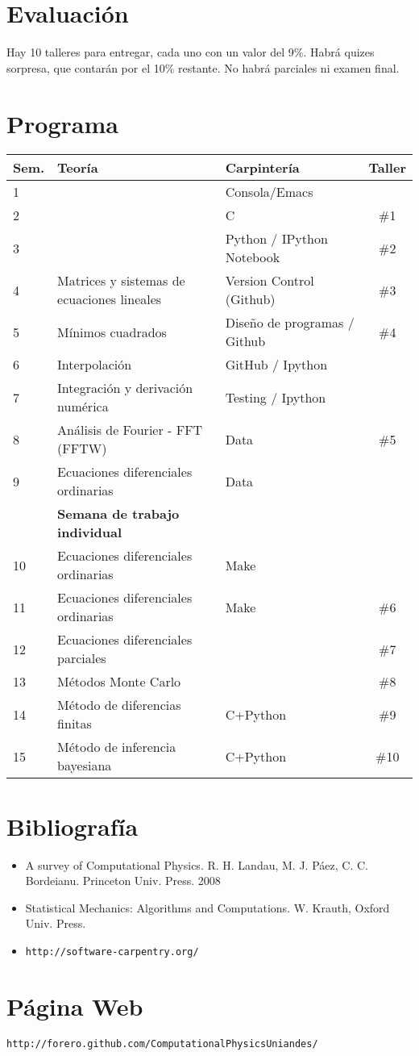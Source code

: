 \documentclass[12pt]{article}
\begin{document}
\section*{Evaluaci\'on}
Hay 10 talleres para entregar, cada uno con un valor del 9\%. Habr\'a  quizes sorpresa, que contar\'an por el 10\% restante. No habr\'a parciales ni examen final.

 
\section*{Programa}

\begin{center}
\begin{tabular}{|l|l|l|c|}
\hline
Sem. & Teor\'ia & Carpinter\'ia & Taller \\\hline
1 & 	&Consola/Emacs &\\
2 & 	&C  & \#1\\
3 & 	&Python / IPython Notebook & \#2\\
4 & Matrices y sistemas de ecuaciones lineales  & Version Control (Github) &\#3\\
5 & M\'inimos cuadrados & Dise\~no de programas / Github& \#4\\
6 & Interpolaci\'on & GitHub / Ipython& \\
7 & Integraci\'on y derivaci\'on num\'erica & Testing / Ipython &\\
8 & An\'alisis de Fourier - FFT  (FFTW)&  Data & \#5 \\
9 & Ecuaciones diferenciales ordinarias & Data &\\
 & {\bf Semana de trabajo individual} & &\\
10 & Ecuaciones diferenciales ordinarias & Make & \\
11 & Ecuaciones diferenciales ordinarias &  Make & \#6\\
12 & Ecuaciones diferenciales parciales &  &\#7\\
13 & M\'etodos Monte Carlo &   &\#8\\
14 & M\'etodo de diferencias finitas & C+Python &\#9\\
15 & M\'etodo de inferencia bayesiana& C+Python &\#10\\
\hline
\end{tabular}
\end{center}


\section*{Bibliograf\'ia}
\begin{itemize}
\item
A survey of Computational Physics. R. H. Landau, M. J. P\'aez, C. C.
Bordeianu. Princeton Univ. Press. 2008 
\item
Statistical Mechanics: Algorithms and Computations. W. Krauth, Oxford Univ. Press. 
\item\verb"http://software-carpentry.org/"
\end{itemize}

\section*{P\'agina Web}
\begin{verbatim}
http://forero.github.com/ComputationalPhysicsUniandes/
\end{verbatim}

 
\end{document}
